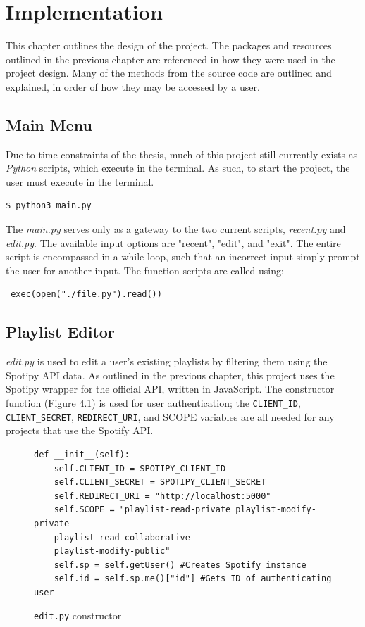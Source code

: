 %
%
%
\chapter{Implementation}\label{ch:implem}
This chapter outlines the design of the project. The packages and resources outlined
in the previous chapter are referenced in how they were used in the project design.
Many of the methods from the source code are outlined and explained, in order of how
they may be accessed by a user.

\section{Main Menu}
Due to time constraints of the thesis, much of this project still currently exists
as \textit{Python} scripts, which execute in the terminal. As such, to start the
project, the user must execute in the terminal.
\begin{lstlisting}[language=bash]
  $ python3 main.py
\end{lstlisting}

The \textit{main.py} serves only as a gateway to the two current scripts,
\textit{recent.py} and \textit{edit.py}. The available input options are "recent",
"edit", and "exit". The entire script is encompassed in a while loop, such that
an incorrect input simply prompt the user for another input. The function scripts
are called using: \begin{verbatim} exec(open("./file.py").read()) \end{verbatim}

\section{Playlist Editor}
\textit{edit.py} is used to edit a user's existing playlists by filtering them
using the Spotipy API data. As outlined in the previous chapter, this project uses
the Spotipy wrapper for the official API, written in JavaScript. The constructor
function (Figure 4.1) is used for user authentication; the \texttt{CLIENT\_ID},
\texttt{CLIENT\_SECRET}, \texttt{REDIRECT\_URI},
and SCOPE variables are all needed for any projects that use the Spotify API.

\pagebreak
\begin{figure}
\begin{lstlisting}[aboveskip=0pt]
  def __init__(self):
    self.CLIENT_ID = SPOTIPY_CLIENT_ID
    self.CLIENT_SECRET = SPOTIPY_CLIENT_SECRET
    self.REDIRECT_URI = "http://localhost:5000"
    self.SCOPE = "playlist-read-private playlist-modify-private
    playlist-read-collaborative
    playlist-modify-public"
    self.sp = self.getUser() #Creates Spotify instance
    self.id = self.sp.me()["id"] #Gets ID of authenticating user
\end{lstlisting}
\caption{{\tt edit.py} constructor}
\end{figure}


